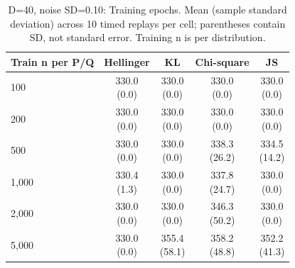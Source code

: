 \begin{table}[t]
\centering
\small
\setlength{\tabcolsep}{4pt}
\caption{D=40, noise SD=0.10: Training epochs. Mean (sample standard deviation) across 10 timed replays per cell; parentheses contain SD, not standard error. Training n is per distribution.}
\label{tab:sim-d-40-noise-sd-0-10-training-epochs}
\begin{tabular}{lcccc}
\toprule
Train n per P/Q & Hellinger & KL & Chi-square & JS \\
\midrule
100 & \shortstack{330.0\\(0.0)} & \shortstack{330.0\\(0.0)} & \shortstack{330.0\\(0.0)} & \shortstack{330.0\\(0.0)} \\
200 & \shortstack{330.0\\(0.0)} & \shortstack{330.0\\(0.0)} & \shortstack{330.0\\(0.0)} & \shortstack{330.0\\(0.0)} \\
500 & \shortstack{330.0\\(0.0)} & \shortstack{330.0\\(0.0)} & \shortstack{338.3\\(26.2)} & \shortstack{334.5\\(14.2)} \\
1,000 & \shortstack{330.4\\(1.3)} & \shortstack{330.0\\(0.0)} & \shortstack{337.8\\(24.7)} & \shortstack{330.0\\(0.0)} \\
2,000 & \shortstack{330.0\\(0.0)} & \shortstack{330.0\\(0.0)} & \shortstack{346.3\\(50.2)} & \shortstack{330.0\\(0.0)} \\
5,000 & \shortstack{330.0\\(0.0)} & \shortstack{355.4\\(58.1)} & \shortstack{358.2\\(48.8)} & \shortstack{352.2\\(41.3)} \\
\bottomrule
\end{tabular}
\end{table}

